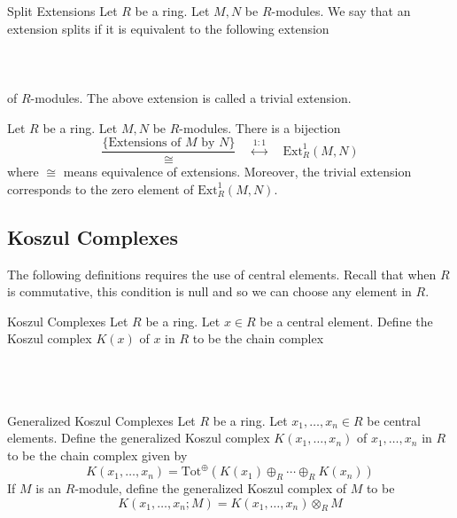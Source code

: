 \documentclass[a4paper]{article}
\begin{document}
\begin{defn}{Split Extensions}{} Let $R$ be a ring. Let $M,N$ be $R$-modules. We say that an extension splits if it is equivalent to the following extension \\~\\
 \\~\\
of $R$-modules. The above extension is called a trivial extension. 
\end{defn}

\begin{thm}{}{} Let $R$ be a ring. Let $M,N$ be $R$-modules. There is a bijection $$\frac{\{\text{Extensions of }M\text{ by }N\}}{\cong}\;\;\;\;\overset{1:1}{\longleftrightarrow}\;\;\;\;\text{Ext}_R^1(M,N)$$ where $\cong$ means equivalence of extensions. Moreover, the trivial extension corresponds to the zero element of $\text{Ext}_R^1(M,N)$. 
\end{thm}

\subsection{Koszul Complexes}
The following definitions requires the use of central elements. Recall that when $R$ is commutative, this condition is null and so we can choose any element in $R$. 

\begin{defn}{Koszul Complexes}{} Let $R$ be a ring. Let $x\in R$ be a central element. Define the Koszul complex $K(x)$ of $x$ in $R$ to be the chain complex \\~\\
 \\~\\
\end{defn}

\begin{defn}{Generalized Koszul Complexes}{} Let $R$ be a ring. Let $x_1,\dots,x_n\in R$ be central elements. Define the generalized Koszul complex $K(x_1,\dots,x_n)$ of $x_1,\dots,x_n$ in $R$ to be the chain complex given by $$K(x_1,\dots,x_n)=\text{Tot}^\oplus\left(K(x_1)\oplus_R\cdots\oplus_R K(x_n)\right)$$ If $M$ is an $R$-module, define the generalized Koszul complex of $M$ to be $$K(x_1,\dots,x_n;M)=K(x_1,\dots,x_n)\otimes_R M$$
\end{defn}
\end{document}
